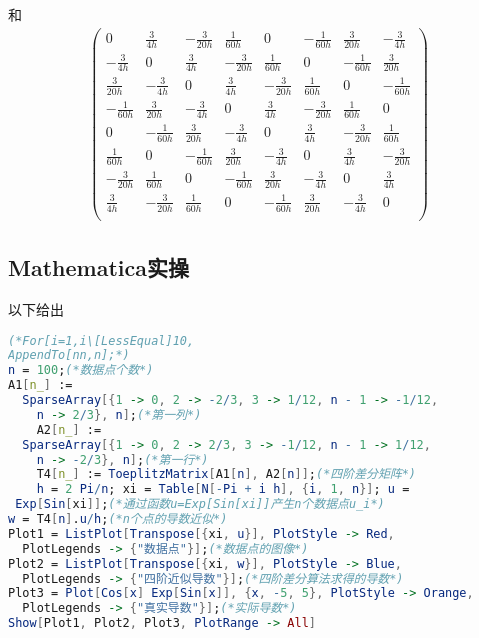 和
\begin{equation}
\begin{aligned}
\left(
\begin{array}{cccccccc}
 0 & \frac{3}{4 h} & -\frac{3}{20 h} & \frac{1}{60 h} & 0 & -\frac{1}{60 h} & \frac{3}{20 h} & -\frac{3}{4 h} \\
 -\frac{3}{4 h} & 0 & \frac{3}{4 h} & -\frac{3}{20 h} & \frac{1}{60 h} & 0 & -\frac{1}{60 h} & \frac{3}{20 h} \\
 \frac{3}{20 h} & -\frac{3}{4 h} & 0 & \frac{3}{4 h} & -\frac{3}{20 h} & \frac{1}{60 h} & 0 & -\frac{1}{60 h} \\
 -\frac{1}{60 h} & \frac{3}{20 h} & -\frac{3}{4 h} & 0 & \frac{3}{4 h} & -\frac{3}{20 h} & \frac{1}{60 h} & 0 \\
 0 & -\frac{1}{60 h} & \frac{3}{20 h} & -\frac{3}{4 h} & 0 & \frac{3}{4 h} & -\frac{3}{20 h} & \frac{1}{60 h} \\
 \frac{1}{60 h} & 0 & -\frac{1}{60 h} & \frac{3}{20 h} & -\frac{3}{4 h} & 0 & \frac{3}{4 h} & -\frac{3}{20 h} \\
 -\frac{3}{20 h} & \frac{1}{60 h} & 0 & -\frac{1}{60 h} & \frac{3}{20 h} & -\frac{3}{4 h} & 0 & \frac{3}{4 h} \\
 \frac{3}{4 h} & -\frac{3}{20 h} & \frac{1}{60 h} & 0 & -\frac{1}{60 h} & \frac{3}{20 h} & -\frac{3}{4 h} & 0 \\
\end{array}
\right)
\end{aligned}~
\end{equation}

\subsection{Mathematica实操}
以下给出
\begin{lstlisting}[language=mathematica, caption=Mathematica自写Toeplitz矩阵代码]
(*For[i=1,i\[LessEqual]10,
AppendTo[nn,n];*)
n = 100;(*数据点个数*)
A1[n_] := 
  SparseArray[{1 -> 0, 2 -> -2/3, 3 -> 1/12, n - 1 -> -1/12, 
    n -> 2/3}, n];(*第一列*)
	A2[n_] := 
  SparseArray[{1 -> 0, 2 -> 2/3, 3 -> -1/12, n - 1 -> 1/12, 
    n -> -2/3}, n];(*第一行*)
	T4[n_] := ToeplitzMatrix[A1[n], A2[n]];(*四阶差分矩阵*)
	h = 2 Pi/n; xi = Table[N[-Pi + i h], {i, 1, n}]; u = 
 Exp[Sin[xi]];(*通过函数u=Exp[Sin[xi]]产生n个数据点u_i*)
w = T4[n].u/h;(*n个点的导数近似*)
Plot1 = ListPlot[Transpose[{xi, u}], PlotStyle -> Red, 
  PlotLegends -> {"数据点"}];(*数据点的图像*)
Plot2 = ListPlot[Transpose[{xi, w}], PlotStyle -> Blue, 
  PlotLegends -> {"四阶近似导数"}];(*四阶差分算法求得的导数*)
Plot3 = Plot[Cos[x] Exp[Sin[x]], {x, -5, 5}, PlotStyle -> Orange, 
  PlotLegends -> {"真实导数"}];(*实际导数*)
Show[Plot1, Plot2, Plot3, PlotRange -> All]
\end{lstlisting}